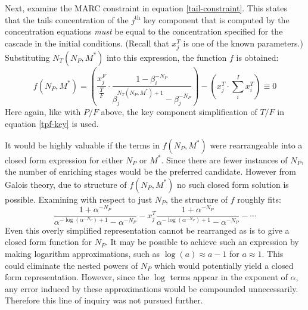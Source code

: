 \documentclass[preprint,12pt]{elsarticle}
\newcommand{\jth}[0]{$j^{\mbox{th}}$ }
\begin{document}
Next, examine the MARC constraint in equation \ref{tail-constraint}.  This states that
the tails concentration of the \jth key component that is computed by the concentration
equations \emph{must} be equal to the concentration specified for the cascade in the
initial conditions.  (Recall that $x_j^T$ is one of the known parameters.)  
Substituting $N_T(N_P, M^*)$ into this expression, the function $f$ is obtained:
\begin{equation}
f(N_P,M^*) =
\left(\frac{x_j^F}{\frac{T}{F}} \cdot \frac{1 - \beta_i^{-N_P}}
                                           {\beta_j^{N_T(N_P,M^*)+1} - \beta_j^{-N_P}} \right)
- \left(x_j^T\cdot\sum_i^{I} x_i^T\right) \equiv 0
\end{equation}
Here again, like with $P/F$ above, the key component simplification of $T/F$ in 
equation \ref{tpf-key} is used.

It would be highly valuable if the terms in $f(N_P,M^*)$ were rearrangeable into 
a closed form expression
for either $N_P$ or $M^*$.  Since there are fewer instances of $N_P$, the number of
enriching stages would be the preferred candidate.  However from Galois theory, 
due to structure of $f(N_P,M^*)$ no such closed form solution is possible.  Examining
with respect to just $N_P$, the structure of $f$ roughly fits:
\begin{equation}
\frac{1 + \alpha^{-N_P}}{\alpha^{-\log(\alpha^{-N_P})+1} - \alpha^{-N_P}} - x_j^T
    \frac{1 + \alpha^{-N_P}}{\alpha^{-\log(\alpha^{-N_P})+1} - \alpha^{-N_P}} -
    \cdots 
\end{equation}
Even this overly simplified representation cannot be rearranged as is to give a 
closed form function for $N_P$.  It may be possible to achieve such an expression 
by making logarithm approximations, such as $\log(a) \approx a - 1$ for $a\approx1$.  
This could 
eliminate the nested powers of $N_P$ which would potentially yield
a closed form representation.  However, since the $\log$ terms appear in the exponent
of $\alpha$, any error induced by these approximations would be compounded 
unnecessarily.  Therefore this line of inquiry was not pursued further.
\end{document}
